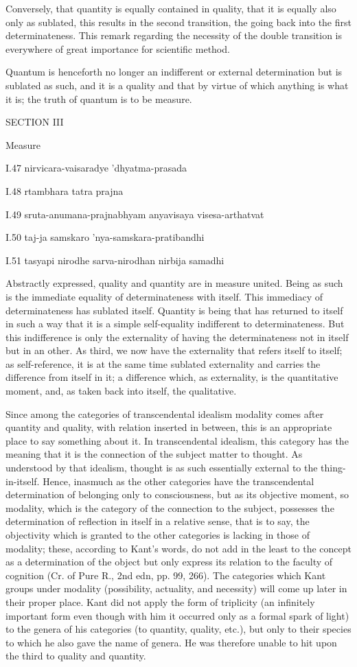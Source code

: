 Conversely, that quantity is equally contained in quality,
that it is equally also only as sublated,
this results in the second transition,
the going back into the first determinateness.
This remark regarding the necessity of the double transition
is everywhere of great importance for scientific method.

Quantum is henceforth no longer an indifferent
or external determination but is sublated as such,
and it is a quality and that by virtue of which
anything is what it is;
the truth of quantum is to be measure.

SECTION III

Measure

I.47
nirvicara-vaisaradye 'dhyatma-prasada

I.48
rtambhara tatra prajna

I.49
sruta-anumana-prajnabhyam anyavisaya visesa-arthatvat

I.50
taj-ja samskaro 'nya-samskara-pratibandhi

I.51
tasyapi nirodhe sarva-nirodhan nirbija samadhi

Abstractly expressed, quality and quantity are in measure united.
Being as such is the immediate equality of determinateness with itself.
This immediacy of determinateness has sublated itself.
Quantity is being that has returned to itself in such a way
that it is a simple self-equality indifferent to determinateness.
But this indifference is only the externality of having
the determinateness not in itself but in an other.
As third, we now have the externality that refers itself to itself;
as self-reference, it is at the same time sublated externality and
carries the difference from itself in it;
a difference which, as externality, is the quantitative moment,
and, as taken back into itself, the qualitative.

Since among the categories of transcendental idealism
modality comes after quantity and quality,
with relation inserted in between,
this is an appropriate place to say something about it.
In transcendental idealism, this category has the meaning that
it is the connection of the subject matter to thought.
As understood by that idealism, thought is as such
essentially external to the thing-in-itself.
Hence, inasmuch as the other categories have
the transcendental determination of
belonging only to consciousness,
but as its objective moment,
so modality, which is the category of
the connection to the subject,
possesses the determination of
reflection in itself in a relative sense,
that is to say, the objectivity
which is granted to the other categories
is lacking in those of modality;
these, according to Kant's words,
do not add in the least to the concept
as a determination of the object
but only express its relation to the faculty of cognition
(Cr. of Pure R., 2nd edn, pp. 99, 266).
The categories which Kant groups under modality
(possibility, actuality, and necessity)
will come up later in their proper place.
Kant did not apply the form of triplicity
(an infinitely important form even though with him
it occurred only as a formal spark of light)
to the genera of his categories (to quantity, quality, etc.),
but only to their species to which
he also gave the name of genera.
He was therefore unable to hit upon
the third to quality and quantity.

